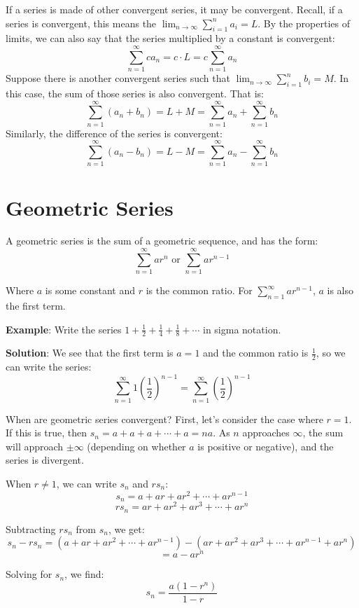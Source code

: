 If a series is made of other convergent series, it may be convergent. Recall, 
if a series is convergent, this means the $\lim_{n \to \infty} \sum_{i=1}^n 
a_i = L$. By the properties of limits, we can also say that the series 
multiplied by a constant is convergent:
$$\sum_{n=1}^\infty ca_n = c \cdot L = c \sum_{n=1}^\infty a_n$$
Suppose there is another convergent series such that $\lim_{n \to \infty} 
\sum_{i=1}^n b_i = M$. In this case, the sum of those series is also convergent. That is:
$$\sum_{n=1}^\infty \left( a_n + b_n \right) = L + M = \sum_{n=1}^\infty a_n + 
\sum_{n=1}^\infty b_n$$
Similarly, the difference of the series is convergent:
$$\sum_{n=1}^\infty \left( a_n - b_n \right) = L - M = \sum_{n=1}^\infty a_n - 
\sum_{n=1}^\infty b_n$$

\section{Geometric Series}

A geometric series is the sum of a geometric sequence, and has the form:
$$\sum_{n=1}^\infty ar^n \text{ or } \sum_{n=1}^\infty ar^{n-1}$$ 

Where $a$ is some constant and $r$ is the common ratio. For $\sum_{n=1}^\infty 
ar^{n-1}$, $a$ is also the first term. 

\textbf{Example}: Write the series $1 + \frac{1}{2} + \frac{1}{4} + 
\frac{1}{8} + \cdots$ in sigma notation.

\textbf{Solution}: We see that the first term is $a=1$ and the common ratio is 
$\frac{1}{2}$, so we can write the series: $$\sum_{n=1}^\infty 1(\frac{1}{2})^
{n-1} = \sum_{n=1}^\infty (\frac{1}{2})^{n-1}$$

When are geometric series convergent? First, let's consider the case 
where $r=1$. If this is true, then $s_n = a + a + a + \cdots + a = 
na$. As $n$ approaches $\infty$, the sum will approach $\pm \infty$ 
(depending on whether $a$ is positive or negative), and the series is 
divergent. 

When $r \neq 1$, we can write $s_n$ and $rs_n$:
$$s_n = a + ar + ar^2 + \cdots + ar^{n-1}$$
$$rs_n = ar + ar^2 + ar^3 + \cdots + ar^n$$

Subtracting $rs_n$ from $s_n$, we get:
$$s_n - rs_n = (a + ar + ar^2 + \cdots + ar^{n-1}) - (ar + ar^2 + 
ar^3 + \cdots + ar^{n-1} + ar^n)$$
$$= a - ar^n$$

Solving for $s_n$, we find:
$$s_n = \frac{a(1-r^n)}{1-r}$$

